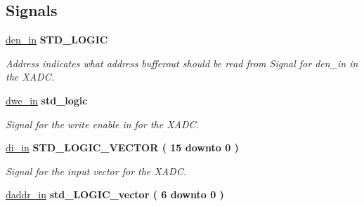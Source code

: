 \subsection*{Signals}
 \begin{DoxyCompactItemize}
\item 
\hypertarget{classADC__TOP_1_1TOP__ADC_ab48f33ef761b1b52e2b08c1d8ef76334}{\hyperlink{classADC__TOP_1_1TOP__ADC_ab48f33ef761b1b52e2b08c1d8ef76334}{den\-\_\-in} {\bfseries \textcolor{comment}{S\-T\-D\-\_\-\-L\-O\-G\-I\-C}\textcolor{vhdlchar}{ }} }\label{classADC__TOP_1_1TOP__ADC_ab48f33ef761b1b52e2b08c1d8ef76334}

\begin{DoxyCompactList}\small\item\em Address indicates what address bufferout should be read from Signal for den\-\_\-in in the X\-A\-D\-C. \end{DoxyCompactList}\item 
\hypertarget{classADC__TOP_1_1TOP__ADC_afeaa67943e27d8c3ee9651159bd9193d}{\hyperlink{classADC__TOP_1_1TOP__ADC_afeaa67943e27d8c3ee9651159bd9193d}{dwe\-\_\-in} {\bfseries \textcolor{comment}{std\-\_\-logic}\textcolor{vhdlchar}{ }} }\label{classADC__TOP_1_1TOP__ADC_afeaa67943e27d8c3ee9651159bd9193d}

\begin{DoxyCompactList}\small\item\em Signal for the write enable in for the X\-A\-D\-C. \end{DoxyCompactList}\item 
\hypertarget{classADC__TOP_1_1TOP__ADC_a6116bc00f8788e5cc6bc5deb069fdc53}{\hyperlink{classADC__TOP_1_1TOP__ADC_a6116bc00f8788e5cc6bc5deb069fdc53}{di\-\_\-in} {\bfseries \textcolor{comment}{S\-T\-D\-\_\-\-L\-O\-G\-I\-C\-\_\-\-V\-E\-C\-T\-O\-R}\textcolor{vhdlchar}{ }\textcolor{vhdlchar}{(}\textcolor{vhdlchar}{ }\textcolor{vhdlchar}{ } \textcolor{vhdldigit}{15} \textcolor{vhdlchar}{ }\textcolor{vhdlchar}{ }\textcolor{vhdlchar}{ }\textcolor{vhdlkeyword}{downto}\textcolor{vhdlchar}{ }\textcolor{vhdlchar}{ }\textcolor{vhdlchar}{ } \textcolor{vhdldigit}{0} \textcolor{vhdlchar}{ }\textcolor{vhdlchar}{)}\textcolor{vhdlchar}{ }} }\label{classADC__TOP_1_1TOP__ADC_a6116bc00f8788e5cc6bc5deb069fdc53}

\begin{DoxyCompactList}\small\item\em Signal for the input vector for the X\-A\-D\-C. \end{DoxyCompactList}\item 
\hypertarget{classADC__TOP_1_1TOP__ADC_a72126e522b97fa2b659a65d687081a41}{\hyperlink{classADC__TOP_1_1TOP__ADC_a72126e522b97fa2b659a65d687081a41}{daddr\-\_\-in} {\bfseries \textcolor{comment}{std\-\_\-\-L\-O\-G\-I\-C\-\_\-vector}\textcolor{vhdlchar}{ }\textcolor{vhdlchar}{(}\textcolor{vhdlchar}{ }\textcolor{vhdlchar}{ } \textcolor{vhdldigit}{6} \textcolor{vhdlchar}{ }\textcolor{vhdlchar}{ }\textcolor{vhdlchar}{ }\textcolor{vhdlkeyword}{downto}\textcolor{vhdlchar}{ }\textcolor{vhdlchar}{ }\textcolor{vhdlchar}{ } \textcolor{vhdldigit}{0} \textcolor{vhdlchar}{ }\textcolor{vhdlchar}{)}\textcolor{vhdlchar}{ }} }\label{classADC__TOP_1_1TOP__ADC_a72126e522b97fa2b659a65d687081a41}


\end{DoxyCompactItemize}
